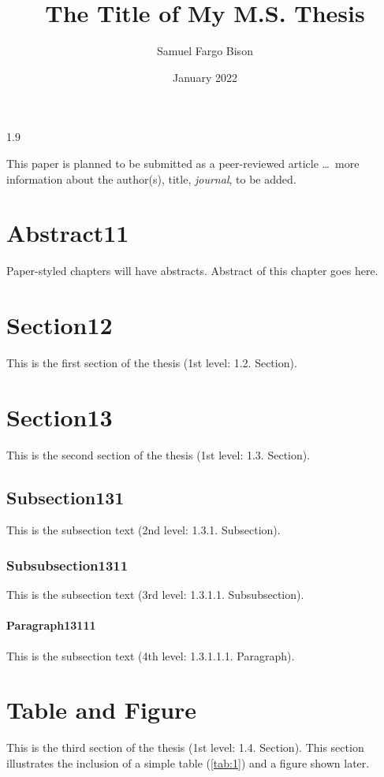 \documentclass[ms-thesis,12pt,mathdesign]{ndsu-thesis-2022}
\title{The Title of My M.S. Thesis}
\author{Samuel Fargo Bison}
\date{January 2022}
\newcommand\myspacing{1.9} %
\begin{document}
\begin{spacing}{\myspacing}      %

{This paper is planned to be submitted as a peer-reviewed article \ldots\ more information 
about the author(s),  title,  \emph{journal},  to be added.}

\section{Abstract11}
Paper-styled chapters will have abstracts. Abstract of this chapter goes here. \kant[1]

\section{Section12}
This is the first section of the thesis (1st level: 1.2. Section). \kant[2]

\section{Section13}
This is the second section of the thesis (1st level: 1.3. Section). \kant[3]

\subsection{Subsection131}
This is the subsection text (2nd level: 1.3.1. Subsection). \kant[4]

\subsubsection{Subsubsection1311}
This is the subsection text (3rd level: 1.3.1.1. Subsubsection). \kant[5]

\paragraph{Paragraph13111}
This is the subsection text (4th level: 1.3.1.1.1. Paragraph). \kant[6]

\section{Table and Figure}
This is the third section of the thesis (1st level: 1.4. Section). This section
illustrates the inclusion of a simple table (\cref{tab:1}) and a figure shown later.


\end{spacing}
\end{document}
